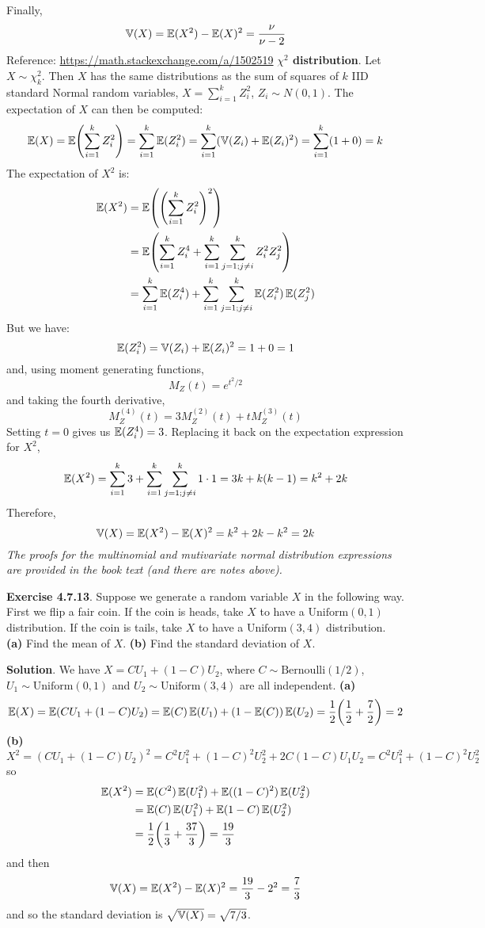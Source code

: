 Finally,
\[
\operatorname{\mathbb{V}}(X) = \operatorname{\mathbb{E}}(X^{2}) - \operatorname{\mathbb{E}}(X)^{2} = \frac{\nu}{\nu - 2}
\]
Reference: \url{https://math.stackexchange.com/a/1502519}
\textbf{\(\chi^{2}\) distribution}. Let \(X \sim \chi^{2}_{k}\). Then \(X\)
has the same distributions as the sum of squares of \(k\) IID standard
Normal random variables, \(X = \sum_{i=1}^{k} Z_{i}^{2}\),
\(Z_{i} \sim N(0, 1)\).
The expectation of \(X\) can then be computed:
\[
\EXP(X) = \EXP\left( \sum_{i=1}^{k} Z_{i}^{2} \right) = \sum_{i=1}^{k} \EXP(Z_{i}^{2}) = \sum_{i=1}^{k} (\VAR(Z_{i}) + \EXP(Z_{i})^{2}) = \sum_{i=1}^{k} (1 + 0) = k
\]
The expectation of \(X^{2}\) is:
\begin{align*}
\EXP(X^{2}) &= \EXP\left( \left( \sum_{i=1}^{k} Z_{i}^{2} \right)^{2} \right) \\
&= \EXP\left( \sum_{i=1}^{k} Z_{i}^{4} + \sum_{i=1}^{k} \sum_{j=1; j \neq i}^{k} Z_{i}^{2} Z_{j}^{2} \right) \\
&= \sum_{i=1}^{k} \EXP(Z_{i}^{4}) + \sum_{i=1}^{k} \sum_{j=1; j \neq i}^{k} \EXP(Z_{i}^{2}) \EXP(Z_{j}^{2})
\end{align*}
But we have:
\[
\operatorname{\mathbb{E}}(Z_{i}^{2}) = \operatorname{\mathbb{V}}(Z_{i}) + \operatorname{\mathbb{E}}(Z_{i})^{2} = 1 + 0 = 1
\]
and, using moment generating functions,
\[
M_Z(t) = e^{t^{2} / 2}
\]
and taking the fourth derivative,
\[
M_Z^{(4)}(t) = 3 M_Z^{(2)}(t) + t M_Z^{(3)}(t)
\]
Setting \(t = 0\) gives us \(\operatorname{\mathbb{E}}(Z_{i}^{4}) = 3\).
Replacing it back on the expectation expression for \(X^{2}\),
\[
\operatorname{\mathbb{E}}(X^{2}) = \sum_{i=1}^{k} 3 + \sum_{i=1}^{k} \sum_{j=1; j \neq i}^{k} 1 \cdot 1 = 3k + k(k-1) = k^{2} + 2k
\]
Therefore,
\[
\operatorname{\mathbb{V}}(X) = \operatorname{\mathbb{E}}(X^{2}) - \operatorname{\mathbb{E}}(X)^{2} = k^{2} + 2k - k^{2} = 2k
\]
\emph{The proofs for the multinomial and mutivariate normal distribution
expressions are provided in the book text (and there are notes above).}

\textbf{Exercise 4.7.13}. Suppose we generate a random variable \(X\) in
the following way. First we flip a fair coin. If the coin is heads, take
\(X\) to have a \(\text{Uniform}(0, 1)\) distribution. If the coin is
tails, take \(X\) to have a \(\text{Uniform}(3, 4)\) distribution.
\textbf{(a)} Find the mean of \(X\).
\textbf{(b)} Find the standard deviation of \(X\).

\textbf{Solution}. We have \(X = C U_{1} + (1 - C)U_{2}\), where
\(C \sim \text{Bernoulli}(1/2)\), \(U_{1} \sim \text{Uniform}(0, 1)\) and
\(U_{2} \sim \text{Uniform}(3, 4)\) are all independent.
\textbf{(a)}
\[
\EXP(X) = \EXP(CU_{1} + (1 - C)U_{2}) = \EXP(C)\EXP(U_{1}) + (1 - \EXP(C))\EXP(U_{2}) = \frac{1}{2} \left(\frac{1}{2} + \frac{7}{2}\right) = 2
\]
\textbf{(b)}
\[
X^{2} = (CU_{1} + (1 - C)U_{2})^{2} = C^{2}U_{1}^{2} + (1 - C)^{2} U_{2}^{2} + 2C(1 - C)U_{1}U_{2} = C^{2}U_{1}^{2} + (1 - C)^{2} U_{2}^{2}
\]
so
\begin{align*}
\EXP(X^{2}) &= \EXP(C^{2})\EXP(U_{1}^{2}) + \EXP((1 - C)^{2}) \EXP(U_{2}^{2}) \\
&= \EXP(C) \EXP(U_{1}^{2}) + \EXP(1 - C) \EXP(U_{2}^{2}) \\
&= \frac{1}{2} \left( \frac{1}{3} + \frac{37}{3} \right) = \frac{19}{3}
\end{align*}
and then
\[
\operatorname{\mathbb{V}}(X) = \operatorname{\mathbb{E}}(X^{2}) - \operatorname{\mathbb{E}}(X)^{2} = \frac{19}{3} - 2^{2} = \frac{7}{3}
\]
and so the standard deviation is \(\sqrt{\operatorname{\mathbb{V}}(X)} = \sqrt{7/3}\).

